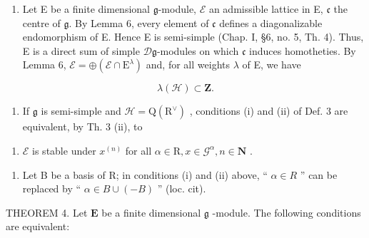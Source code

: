\begin{enumerate}
\def\labelenumi{\arabic{enumi})}
\setcounter{enumi}{2}
\tightlist
\item
  Let E be a finite dimensional \(\mathfrak{g}\)-module, \(\mathcal{E}\) an admissible lattice in E, \(\mathfrak{c}\) the centre of \(\mathfrak{g}\). By Lemma 6, every element of \(\mathfrak{c}\) defines a diagonalizable endomorphism of E. Hence E is semi-simple (Chap. I, §6, no. 5, Th. 4). Thus, E is a direct sum of simple \(\mathcal{D}\mathfrak{g}\)-modules on which \(\mathfrak{c}\) induces homotheties. By Lemma 6, \(\mathcal{E}=\oplus(\mathcal{E}\cap\mathrm{E}^{\lambda})\) and, for all weights \(\lambda\) of E, we have
\end{enumerate}

\[
\lambda (\mathcal {H}) \subset \mathbf {Z}.
\]

\begin{enumerate}
\def\labelenumi{\arabic{enumi})}
\setcounter{enumi}{3}
\tightlist
\item
  If \(\mathfrak{g}\) is semi-simple and \(\mathcal{H} = \mathrm{Q}(\mathrm{R}^{\vee})\) , conditions (i) and (ii) of Def. 3 are equivalent, by Th. 3 (ii), to
\end{enumerate}

\begin{enumerate}
\def\labelenumi{(\roman{enumi})}
\setcounter{enumi}{2}
\tightlist
\item
  \(\mathcal{E}\) is stable under \(x^{(n)}\) for all \(\alpha \in \mathrm{R}, x \in \mathcal{G}^{\alpha}, n \in \mathbf{N}\) .
\end{enumerate}

\begin{enumerate}
\def\labelenumi{\arabic{enumi})}
\setcounter{enumi}{4}
\tightlist
\item
  Let B be a basis of R; in conditions (i) and (ii) above, `` \(\alpha \in R\) '' can be replaced by `` \(\alpha \in B \cup (-B)\) '' (loc. cit).
\end{enumerate}

THEOREM 4. Let \(\mathbf{E}\) be a finite dimensional \(\mathfrak{g}\) -module. The following conditions are equivalent:

